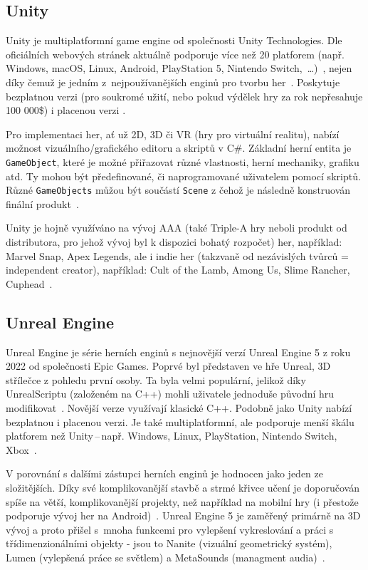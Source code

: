 \subsection*{Unity}
Unity je multiplatformní game engine od společnosti Unity Technologies. Dle oficiálních webových stránek aktuálně podporuje více než 20 platforem (např. Windows, macOS, Linux, Android, PlayStation 5, Nintendo Switch,~\ldots)~\cite{unity_website}, nejen díky čemuž je jedním z~nejpoužívanějších enginů pro tvorbu her~\cite{arnia_unity}. Poskytuje bezplatnou verzi (pro soukromé užití, nebo pokud výdělek hry za rok nepřesahuje 100 000\$) i placenou verzi . 

Pro implementaci her, ať už 2D, 3D či VR (hry pro virtuální realitu), nabízí možnost vizuálního/grafického editoru a skriptů v C\#. Základní herní entita je \verb|GameObject|, které je možné přiřazovat různé vlastnosti, herní mechaniky, grafiku atd. Ty mohou být předefinované, či naprogramované uživatelem pomocí skriptů. Různé \verb|GameObjects| můžou být součástí \verb|Scene| z čehož je následně konstruován finální produkt~\cite{hocking2015unity}.

Unity je hojně využíváno na vývoj AAA (také Triple-A hry neboli produkt od distributora, pro jehož vývoj byl k dispozici bohatý rozpočet) her, například: Marvel Snap, Apex Legends, ale i indie her (takzvaně od nezávislých tvůrců = independent creator), například: Cult of the Lamb, Among Us, Slime Rancher, Cuphead~\cite{unity_website}.

\subsection*{Unreal Engine}
Unreal Engine je série herních enginů s nejnovější verzí Unreal Engine 5 z roku 2022 od společnosti Epic Games. Poprvé byl představen ve hře Unreal, 3D střílečce z pohledu první osoby. Ta byla velmi populární, jelikož díky UnrealScriptu (založeném na C++) mohli uživatele jednoduše původní hru modifikovat~\cite{sanders2016introduction}. Novější verze využívají klasické C++. Podobně jako Unity nabízí bezplatnou i placenou verzi. Je také multiplatformní, ale podporuje menší škálu platforem než Unity\,--\,např. Windows, Linux, PlayStation, Nintendo Switch, Xbox~\cite{unreal_engine}.

V porovnání s dalšími zástupci herních enginů je hodnocen jako jeden ze složitějších. Díky své komplikovanější stavbě a strmé křivce učení je doporučován spíše na větší, komplikovanější projekty, než například na mobilní hry (i přestože podporuje vývoj her na Android)~\cite{Kevuru_Games_Unreal-Unity}. Unreal Engine 5 je zaměřený primárně na 3D vývoj a proto přišel s~mnoha funkcemi pro vylepšení vykreslování a práci s třídimenzionálními objekty - jsou to Nanite (vizuální geometrický systém), Lumen (vylepšená práce se světlem) a MetaSounds (managment audia)~\cite{UnrealEngine5}.

